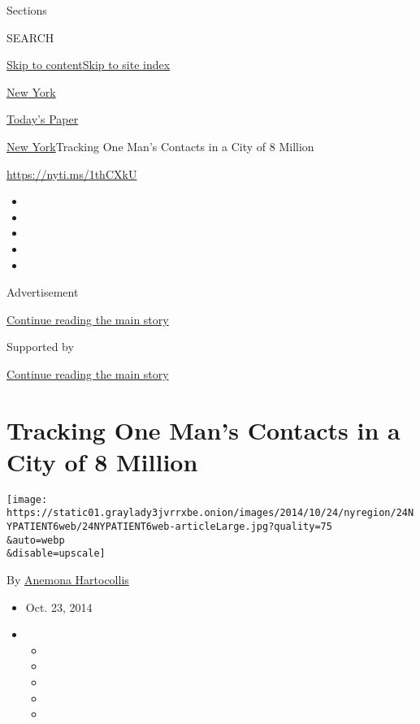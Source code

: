 Sections

SEARCH

\protect\hyperlink{site-content}{Skip to
content}\protect\hyperlink{site-index}{Skip to site index}

\href{https://www.nytimes3xbfgragh.onion/section/nyregion}{New York}

\href{https://myaccount.nytimes3xbfgragh.onion/auth/login?response_type=cookie\&client_id=vi}{}

\href{https://www.nytimes3xbfgragh.onion/section/todayspaper}{Today's
Paper}

\href{/section/nyregion}{New York}\textbar{}Tracking One Man's Contacts
in a City of 8 Million

\url{https://nyti.ms/1thCXkU}

\begin{itemize}
\item
\item
\item
\item
\item
\end{itemize}

Advertisement

\protect\hyperlink{after-top}{Continue reading the main story}

Supported by

\protect\hyperlink{after-sponsor}{Continue reading the main story}

\hypertarget{tracking-one-mans-contacts-in-a-city-of-8-million}{%
\section{Tracking One Man's Contacts in a City of 8
Million}\label{tracking-one-mans-contacts-in-a-city-of-8-million}}

\texttt{[image: https://static01.graylady3jvrrxbe.onion/images/2014/10/24/nyregion/24NYPATIENT6web/24NYPATIENT6web-articleLarge.jpg?quality=75\\\&auto=webp\\\&disable=upscale]}

By
\href{http://www.nytimes3xbfgragh.onion/by/anemona-hartocollis}{Anemona
Hartocollis}

\begin{itemize}
\item
  Oct. 23, 2014
\item
  \begin{itemize}
  \item
  \item
  \item
  \item
  \item
  \end{itemize}
\end{itemize}


